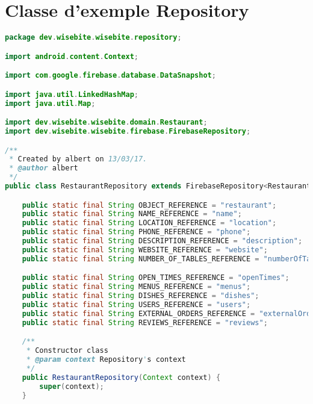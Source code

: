 \clearpage
\section{Classe d'exemple Repository}
\label{RepositoryXXXX}

\begin{lstlisting}[language=java,firstnumber=1]
package dev.wisebite.wisebite.repository;

import android.content.Context;

import com.google.firebase.database.DataSnapshot;

import java.util.LinkedHashMap;
import java.util.Map;

import dev.wisebite.wisebite.domain.Restaurant;
import dev.wisebite.wisebite.firebase.FirebaseRepository;

/**
 * Created by albert on 13/03/17.
 * @author albert
 */
public class RestaurantRepository extends FirebaseRepository<Restaurant> {

    public static final String OBJECT_REFERENCE = "restaurant";
    public static final String NAME_REFERENCE = "name";
    public static final String LOCATION_REFERENCE = "location";
    public static final String PHONE_REFERENCE = "phone";
    public static final String DESCRIPTION_REFERENCE = "description";
    public static final String WEBSITE_REFERENCE = "website";
    public static final String NUMBER_OF_TABLES_REFERENCE = "numberOfTables";

    public static final String OPEN_TIMES_REFERENCE = "openTimes";
    public static final String MENUS_REFERENCE = "menus";
    public static final String DISHES_REFERENCE = "dishes";
    public static final String USERS_REFERENCE = "users";
    public static final String EXTERNAL_ORDERS_REFERENCE = "externalOrders";
    public static final String REVIEWS_REFERENCE = "reviews";

    /**
     * Constructor class
     * @param context Repository's context
     */
    public RestaurantRepository(Context context) {
        super(context);
    }


\end{lstlisting}
